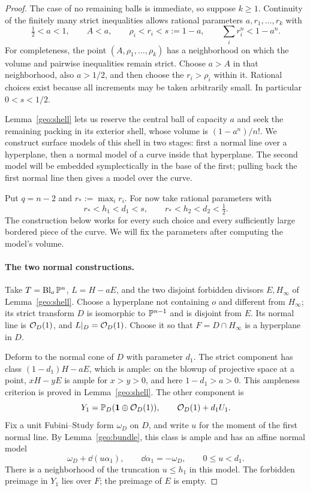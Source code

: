 \begin{proof}
The case of no remaining balls is immediate, so suppose $k\ge1$.
Continuity of the finitely many strict inequalities allows rational
parameters $a,r_1,\ldots,r_k$ with
\begin{equation}\label{app:large-slack}
 \tfrac12<a<1,\qquad A<a,\qquad \rho_i<r_i<s:=1-a,
 \qquad\sum_i r_i^n<1-a^n.
\end{equation}
For completeness, the point $(A,\rho_1,\ldots,\rho_k)$ has a neighborhood
on which the volume and pairwise inequalities remain strict. Choose $a>A$
in that neighborhood, also $a>1/2$, and then choose the $r_i>\rho_i$ within
it. Rational choices exist because all increments may be taken arbitrarily
small. In particular $0<s<1/2$.

Lemma~\ref{geo:shell} lets us reserve the central ball of capacity $a$
and seek the remaining packing in its exterior shell, whose volume is
$(1-a^n)/n!$. We construct surface models of this shell in two stages:
first a normal line over a hyperplane, then a normal model of a curve
inside that hyperplane. The second model will be embedded symplectically
in the base of the first; pulling back the first normal line then gives
a model over the curve.

Put $q=n-2$ and $r_*:=\max_i r_i$. For now take rational parameters with
\[
 r_*<h_1<d_1<s,\qquad r_*<h_2<d_2<\tfrac12.
\]
The construction below works for every such choice and every sufficiently
large bordered piece of the curve. We will fix the parameters after
computing the model's volume.

\paragraph{The two normal constructions.}
Take $T=\operatorname{Bl}_o\mathbb P^n$, $L=H-aE$, and the two disjoint forbidden divisors
$E,H_\infty$ of Lemma~\ref{geo:shell}. Choose a hyperplane not containing
$o$ and different from $H_\infty$; its strict transform $D$ is isomorphic
to $\mathbb P^{n-1}$ and is disjoint from $E$. Its normal line is
$\mathcal O_D(1)$, and $L|_D=\mathcal O_D(1)$. Choose it so that
$F=D\cap H_\infty$ is a hyperplane in $D$.

Deform to the normal cone of $D$ with parameter $d_1$. The strict component
has class $(1-d_1)H-aE$, which is ample: on the blowup of projective space at
a point, $xH-yE$ is ample for $x>y>0$, and here $1-d_1>a>0$.
This ampleness criterion is proved in Lemma~\ref{geo:shell}.
The other component is
\[
 Y_1=\mathbb P_D(\mathbf1\oplus\mathcal O_D(1)),\qquad
 \mathcal O_D(1)+d_1U_1.
\]
Fix a unit Fubini--Study form $\omega_D$ on $D$, and write $u$ for
the moment of the first normal line. By Lemma~\ref{geo:bundle}, this
class is ample and has an affine normal model
\begin{equation}\label{app:first-model}
 \omega_D+\dd(u\alpha_1),\qquad
 \dd\alpha_1=-\omega_D,\qquad 0\le u<d_1.
\end{equation}
There is a neighborhood of the truncation $u\le h_1$ in this model.
The forbidden preimage in $Y_1$ lies over $F$; the preimage of $E$ is empty.


\end{proof}
